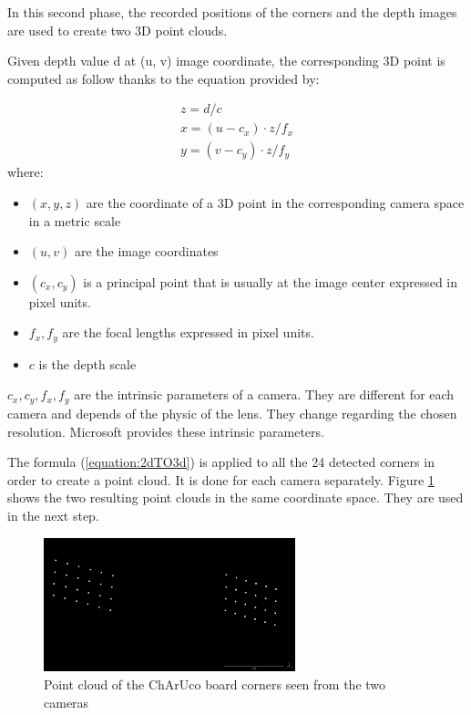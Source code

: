In this second phase, the recorded positions of the corners and the depth images are used to create two 3D point clouds.

Given depth value d at (u, v) image coordinate, the corresponding 3D point is computed as follow thanks to the equation provided by\cite{Zhou2018}:

\begin{equation}
\label{equation:2dTO3d}
    \begin{array}{l}
        {z=d / c} \\
        {x=(u-c _ { x }) \cdot z / f _ { x }} \\
        {y=(v-c _ { y }) \cdot z / f _ { y }}
    \end{array}
\end{equation}
where:
\begin{itemize}
    \item $( x , y , z )$ are the coordinate of a 3D point in the corresponding camera space in a metric scale
    \item $( u , v )$ are the image coordinates
    \item $( c _ { x }, c _ { y })$ is a principal point that is usually at the image center expressed in pixel units.
    \item $ f _ { x }, f _ { y }$ are the focal lengths expressed in pixel units.
    \item $c$ is the depth scale
\end{itemize}
\leavevmode\newline
$c _ { x }, c _ { y }, f _ { x }, f _ { y }$ are the intrinsic parameters of a camera. They are different for each camera and depends of the physic of the lens. They change regarding the chosen resolution. Microsoft provides these intrinsic parameters.

The formula (\ref{equation:2dTO3d}) is applied to all the 24 detected corners in order to create a point cloud. It is done for each camera separately. Figure \ref{figure:pc_arucoboard} shows the two resulting point clouds in the same coordinate space. They are used in the next step.

\begin{figure}[H]
    \centering
    \includegraphics[width=0.65\textwidth]{images/registration/pc_aruco_24.png}
    \caption{Point cloud of the ChArUco board corners seen from the two cameras}
    \label{figure:pc_arucoboard}
\end{figure}


